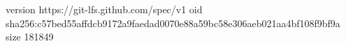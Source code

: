 version https://git-lfs.github.com/spec/v1
oid sha256:c57bed55affdcb9172a9faedad0070e88a59bc58e306aeb021aa4bf108f9bf9a
size 181849

